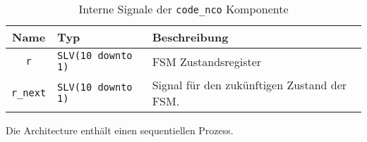 \begin{table}[htbp]
    \ttabbox
    {
        \caption[Code NCO interne Signale]{Interne Signale der \lstinline$code_nco$ Komponente}
        \label{TabCodeNCO_ArchSignals}
    }
    {
    \begin{tabular}{c  p{2cm} p{6cm}}
        \toprule
        Name      & Typ         & Beschreibung \\
        \midrule
        \lstinline$r$  & \lstinline$SLV(10 downto 1)$             & \gls{FSM} Zustandsregister\\
        \lstinline$r_next$  & \lstinline$SLV(10 downto 1)$             & Signal für den zukünftigen Zustand der \gls{FSM}.\\
        \bottomrule
    \end{tabular}
}
\end{table}

Die Architecture enthält einen sequentiellen Prozess.

